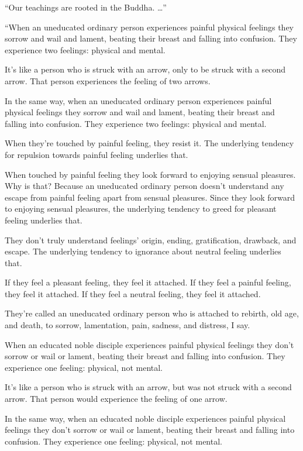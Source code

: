 \documentclass[12pt,openany]{book}%
\begin{document}
“Our teachings are rooted in the Buddha. …” 

“When an uneducated ordinary person experiences painful physical feelings they sorrow and wail and lament, beating their breast and falling into confusion. They experience two feelings: physical and mental. 

It’s like a person who is struck with an arrow, only to be struck with a second arrow. That person experiences the feeling of two arrows. 

In the same way, when an uneducated ordinary person experiences painful physical feelings they sorrow and wail and lament, beating their breast and falling into confusion. They experience two feelings: physical and mental. 

When they’re touched by painful feeling, they resist it. The underlying tendency for repulsion towards painful feeling underlies that. 

When touched by painful feeling they look forward to enjoying sensual pleasures. Why is that? Because an uneducated ordinary person doesn’t understand any escape from painful feeling apart from sensual pleasures. Since they look forward to enjoying sensual pleasures, the underlying tendency to greed for pleasant feeling underlies that. 

They don’t truly understand feelings’ origin, ending, gratification, drawback, and escape. The underlying tendency to ignorance about neutral feeling underlies that. 

If they feel a pleasant feeling, they feel it attached. If they feel a painful feeling, they feel it attached. If they feel a neutral feeling, they feel it attached. 

They’re called an uneducated ordinary person who is attached to rebirth, old age, and death, to sorrow, lamentation, pain, sadness, and distress, I say. 

When an educated noble disciple experiences painful physical feelings they don’t sorrow or wail or lament, beating their breast and falling into confusion. They experience one feeling: physical, not mental. 

It’s like a person who is struck with an arrow, but was not struck with a second arrow. That person would experience the feeling of one arrow. 

In the same way, when an educated noble disciple experiences painful physical feelings they don’t sorrow or wail or lament, beating their breast and falling into confusion. They experience one feeling: physical, not mental. 
\end{document}

